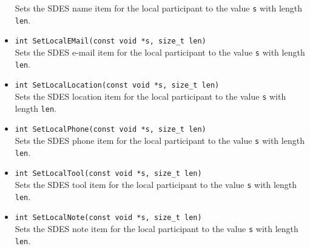 \documentclass[12pt,a4paper]{article}
\begin{document}
\begin{itemize}
						Sets the SDES name item for the local participant to the value {\tt s}
						with length {\tt len}.
					\item {\tt int SetLocalEMail(const void *s, size\_t len)}\\
						Sets the SDES e-mail item for the local participant to the value {\tt s}
						with length {\tt len}.
					\item {\tt int SetLocalLocation(const void *s, size\_t len)}\\
						Sets the SDES location item for the local participant to the value {\tt s}
						with length {\tt len}.
					\item {\tt int SetLocalPhone(const void *s, size\_t len)}\\
						Sets the SDES phone item for the local participant to the value {\tt s}
						with length {\tt len}.
					\item {\tt int SetLocalTool(const void *s, size\_t len)}\\
						Sets the SDES tool item for the local participant to the value {\tt s}
						with length {\tt len}.
					\item {\tt int SetLocalNote(const void *s, size\_t len)}\\
						Sets the SDES note item for the local participant to the value {\tt s}
						with length {\tt len}.
				\end{itemize}
\end{document}
